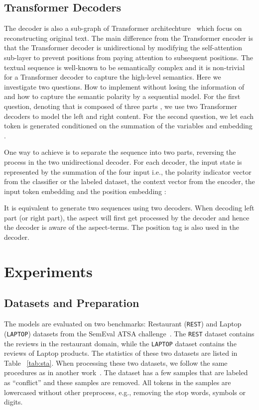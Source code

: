 \documentclass[11pt,a4paper]{article}
\begin{document}
\subsection{Transformer Decoders}
The decoder is also a sub-graph of Transformer architechture~\cite{DBLP:conf/nips/VaswaniSPUJGKP17} which focus on reconstructing original text. The main difference from the Transformer encoder is that the Transformer decoder is unidirectional by modifying the self-attention sub-layer to prevent positions from paying attention to subsequent positions. The textual sequence is well-known to be semantically complex and it is non-trivial for a Transformer decoder to capture the high-level semantics.
Here we investigate two questions.
How to implement  without losing the information of  and how to capture the semantic polarity by a sequential model. For the first question, denoting that  is composed of three parts , we use two Transformer decoders to model the left and right content.
For the second question, we let each token is generated conditioned on the summation of the variables  and embedding .




One way to achieve  is to separate the sequence into two parts, reversing the process in the two unidirectional decoder.
For each decoder, the input state is represented by the summation of the four input i.e., the polarity indicator vector  from the classifier or the labeled dataset, the context vector  from the encoder, the input token embedding  and the position embedding :

It is equivalent to generate two sequences using two decoders.
When decoding left part (or right part), the aspect will first get processed by the decoder and hence the decoder is aware of the aspect-terms.
The position tag is also used in the decoder.










\section{Experiments}
\subsection{Datasets and Preparation}
The models are evaluated on two benchmarks: Restaurant (\texttt{REST}) and Laptop (\texttt{LAPTOP}) datasets from the SemEval ATSA challenge~\cite{DBLP:conf/semeval/PontikiGPPAM14}.
The \texttt{REST} dataset contains the reviews in the restaurant domain, while the \texttt{LAPTOP} dataset contains the reviews of Laptop products.
The statistics of these two datasets are listed in Table ~\ref{tab:sta}.
When processing these two datasets, we follow the same procedures as in another work~\cite{DBLP:conf/acl/LamLSB18}.
The dataset has a few samples that are labeled as ``conflict'' and these samples are removed.
All tokens in the samples are lowercased without other preprocess, e.g., removing the stop words, symbols or digits.
\end{document}
